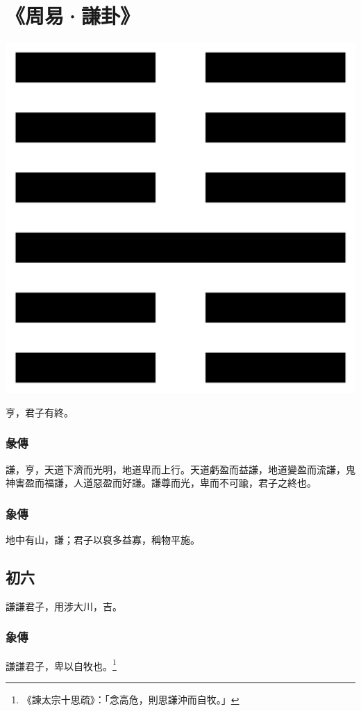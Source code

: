 \documentclass[12pt, a4paper]{article}
\begin{document}
\section{《周易·謙卦》}
\begin{center}
	\includegraphics[width=\textwidth/8]{chiang.png}
\end{center}
亨，君子有終。
\subsubsection{彖傳}
謙，亨，天道下濟而光明，地道卑而上行。天道虧盈而益謙，地道變盈而流謙，鬼神害盈而福謙，人道惡盈而好謙。謙尊而光，卑而不可踰，君子之終也。
\subsubsection{象傳}
地中有山，謙；君子以裒多益寡，稱物平施。
\subsection{初六}
謙謙君子，用涉大川，吉。
\subsubsection{象傳}
謙謙\textsf{君}子，卑以自\textsf{牧}也。\footnote{《諫太宗十思疏》：「念高危，則思謙沖而自牧。」}
\end{document}
